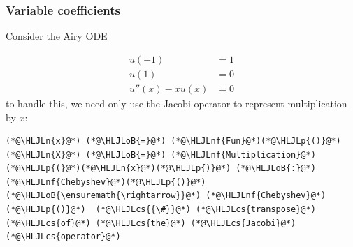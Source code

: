 \documentclass[12pt,a4paper]{article}
\newcommand{\HLJLn}[1]{#1}
\newcommand{\HLJLnf}[1]{\textcolor[RGB]{66,102,213}{#1}}
\newcommand{\HLJLoB}[1]{\textcolor[RGB]{102,102,102}{\textbf{#1}}}
\newcommand{\HLJLp}[1]{#1}
\newcommand{\HLJLcs}[1]{\textcolor[RGB]{153,153,119}{\textit{#1}}}
\begin{document}
\subsubsection{Variable coefficients}
Consider the Airy ODE


\begin{align*}
u(-1) &= 1\\
u(1) &= 0\\
u''(x) - xu(x) &= 0
\end{align*}
to handle this, we need only use the Jacobi operator to represent multiplication by $x$:


\begin{lstlisting}
(*@\HLJLn{x}@*) (*@\HLJLoB{=}@*) (*@\HLJLnf{Fun}@*)(*@\HLJLp{()}@*)
(*@\HLJLn{X}@*) (*@\HLJLoB{=}@*) (*@\HLJLnf{Multiplication}@*)(*@\HLJLp{(}@*)(*@\HLJLn{x}@*)(*@\HLJLp{)}@*) (*@\HLJLoB{:}@*) (*@\HLJLnf{Chebyshev}@*)(*@\HLJLp{()}@*) (*@\HLJLoB{\ensuremath{\rightarrow}}@*) (*@\HLJLnf{Chebyshev}@*)(*@\HLJLp{()}@*)  (*@\HLJLcs{{\#}}@*) (*@\HLJLcs{transpose}@*) (*@\HLJLcs{of}@*) (*@\HLJLcs{the}@*) (*@\HLJLcs{Jacobi}@*) (*@\HLJLcs{operator}@*)
\end{lstlisting}
\end{document}
